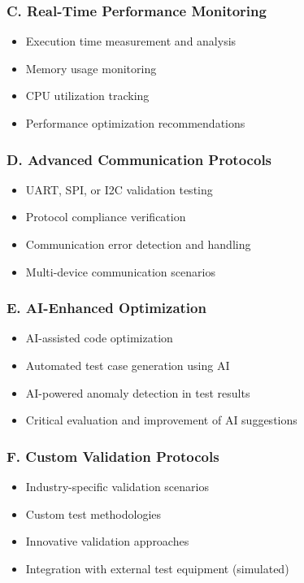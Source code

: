 \documentclass[11pt,a4paper]{article}
\begin{document}
\subsubsection{C. Real-Time Performance Monitoring}
\begin{itemize}
    \item Execution time measurement and analysis
    \item Memory usage monitoring
    \item CPU utilization tracking
    \item Performance optimization recommendations
\end{itemize}

\subsubsection{D. Advanced Communication Protocols}
\begin{itemize}
    \item UART, SPI, or I2C validation testing
    \item Protocol compliance verification
    \item Communication error detection and handling
    \item Multi-device communication scenarios
\end{itemize}

\subsubsection{E. AI-Enhanced Optimization}
\begin{itemize}
    \item AI-assisted code optimization
    \item Automated test case generation using AI
    \item AI-powered anomaly detection in test results
    \item Critical evaluation and improvement of AI suggestions
\end{itemize}

\subsubsection{F. Custom Validation Protocols}
\begin{itemize}
    \item Industry-specific validation scenarios
    \item Custom test methodologies
    \item Innovative validation approaches
    \item Integration with external test equipment (simulated)
\end{itemize}
\end{document}
